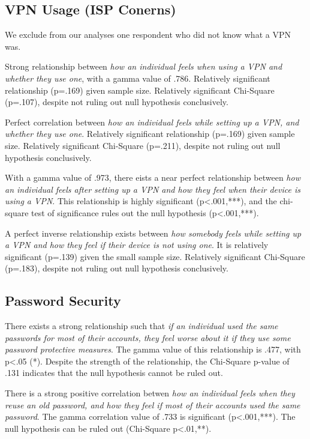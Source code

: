 \documentclass[acmtog]{acmart}
\begin{document}
\subsection{VPN Usage (ISP Conerns)} \label{VPN Usage}
We exclude from our analyses one respondent who did not know what a VPN was.

Strong relationship between \emph{how an individual feels when using a VPN and
whether they use one}, with a gamma value of .786. Relatively significant
relationship (p=.169) given sample size.  Relatively significant Chi-Square
(p=.107), despite not ruling out null hypothesis conclusively.

Perfect correlation between \emph{how an individual feels while setting up a
VPN, and whether they use one}. Relatively significant relationship (p=.169)
given sample size. Relatively significant Chi-Square (p=.211), despite not
ruling out null hypothesis conclusively.

With a gamma value of .973, there eists a near perfect relationship between
\emph{how an individual feels after setting up a VPN and how they feel when
their device is using a VPN}. This relationship is highly significant
(p<.001,***), and the chi-square test of significance rules out the null
hypothesis (p<.001,***).

A perfect inverse relationship exists between \emph{how somebody feels while
setting up a VPN and how they feel if their device is not using one}. It is
relatively significant (p=.139) given the small sample size.  Relatively
significant Chi-Square (p=.183), despite not ruling out null hypothesis
conclusively.

\subsection{Password Security}
There exists a strong relationship such that \emph{if an individual used the
same passwords for most of their accounts, they feel worse about it if they use
some password protective measures}. The gamma value of this relationship is
.477, with p<.05 (*). Despite the strength of the relationship, the Chi-Square
p-value of .131 indicates that the null hypothesis cannot be ruled out.

There is a strong positive correlation betwen \emph{how an individual feels when
they reuse an old password, and how they feel if most of their accounts used the
same password}. The gamma correlation value of .733 is significant (p<.001,***).
The null hypothesis can be ruled out (Chi-Square p<.01,**).
\end{document}

